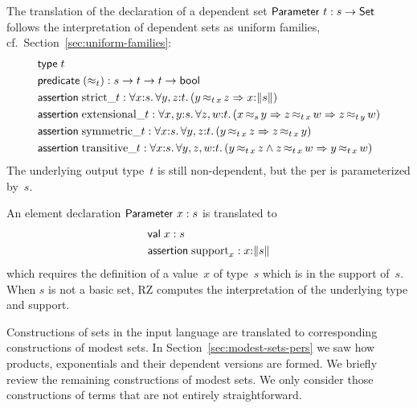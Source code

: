 The translation of the declaration of a dependent set
$\mathsf{Parameter}\ t : s \to \mathsf{Set}$ follows the interpretation of dependent
sets as uniform families, cf.\ Section~\ref{sec:uniform-families}:
%
\begin{align*}  
  & \otyspec{t} \\
  & \opropspec{({\approx_{t}})}{\oarrow{s}{\oarrow{t}{\oarrow{t}{\oProp}}}}\\
  & \oassertion{\mathrm{strict}\_{t}}{
    \oforall{x}{s}{
      \oforall{y,z}{t}{
        (\oimply{\oper{\oapp{t}{x}}{y}{z}}{\ototal{x}{s}})
      }
    }
  } \\
  & \oassertion{\mathrm{extensional}\_{t}}{
    \oforall{x,y}{s}{
      \oforall{z,w}{t}{
        (\oimply{\oper{s}{x}{y}}{
          \oimply{\oper{\oapp{t}{x}}{z}{w}}{\oper{\oapp{t}{y}}{z}{w}}
        })
      }
    }
  } \\
  & \oassertion{\mathrm{symmetric}\_{t}}{
    \oforall{x}{s}{
      \oforall{y,z}{t}{(\oimply{\oper{\oapp{t}{x}}{y}{z}}{\oper{\oapp{t}{x}}{z}{y}})}
    }
  }
  \\
  & \oassertion{\mathrm{transitive}\_{t}}{
    \oforall{x}{s}{
      \oforall{y,z,w}{t}{(
        \oimply{
          \oper{\oapp{t}{x}}{y}{z} \land \oper{\oapp{t}{x}}{z}{w}
        }{\oper{\oapp{t}{x}}{y}{w}}
        )}
    }
  }
\end{align*}
%
The underlying output type~$t$ is still non-dependent, but the per is
parameterized by~$s$.

An element declaration $\mathsf{Parameter}\ x : s$ is translated to
%
\begin{align*}
  & \mathsf{val}\;x:s \\
  & \mathsf{assertion}\; \mathrm{support}_x : x{:}\|s\|
\end{align*}
%
which requires the definition of a value~$x$ of type~$s$ which is in
the support of~$s$. When $s$ is not a basic set, RZ computes the
interpretation of the underlying type and support.

Constructions of sets in the input language are translated to
corresponding constructions of modest sets. In
Section~\ref{sec:modest-sets-pers} we saw how products, exponentials
and their dependent versions are formed. We briefly review the
remaining constructions of modest sets. We only consider those
constructions of terms that are not entirely straightforward.

